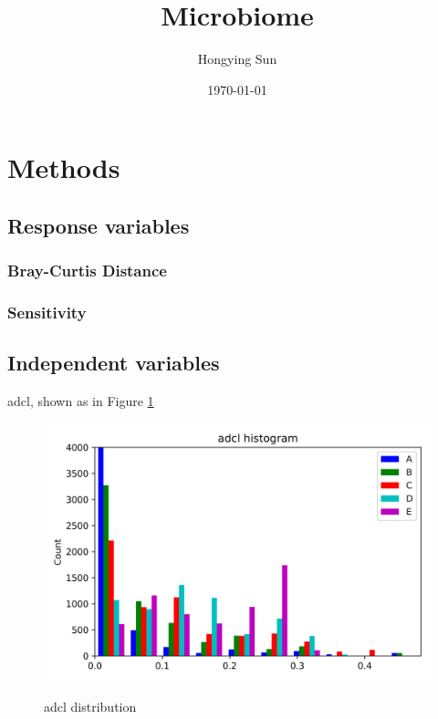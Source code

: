 \documentclass{article}
\title{Microbiome}
\author{Hongying Sun
	}
\date{\today}
\begin{document}
\maketitle

\section{Methods}
\subsection{Response variables}
\subsubsection{Bray-Curtis Distance}
\subsubsection{Sensitivity}
\subsection{Independent variables}

adcl, shown as in Figure \ref{adcl-community}
\begin{figure}[htbp]
	\centering
	\includegraphics[width=\textwidth, keepaspectratio]{adcl-community.png}\\
	\caption{adcl distribution}
	\label{adcl-community}
\end{figure}
\end{document}
